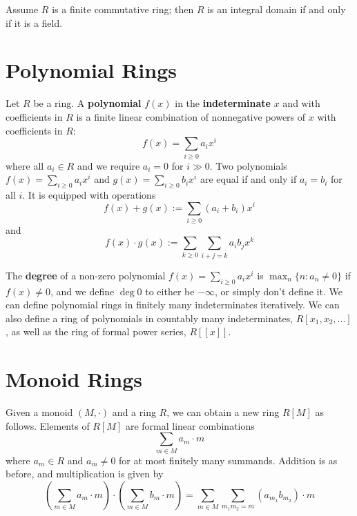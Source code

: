 \documentclass[12pt, a4paper, oneside, openright, titlepage]{book}
\begin{document}
\begin{prop}
    Assume $R$ is a finite commutative ring; then $R$ is an integral domain if and only if it is a field.
\end{prop}

\section{Polynomial Rings}

\begin{defn}
    Let $R$ be a ring. A \textbf{polynomial} $f(x)$ in the \textbf{indeterminate} $x$ and with coefficients in $R$ is a finite linear combination of nonnegative powers of $x$ with coefficients in $R$: \begin{equation*}
        f(x) = \sum_{i\geq 0 }a_ix^i
    \end{equation*}
    where all $a_i \in R$ and we require $a_i = 0$ for $i \gg 0$. Two polynomials $f(x) = \sum_{i\geq 0}a_ix^i$ and $g(x) = \sum_{i\geq 0}b_ix^i$ are equal if and only if $a_i = b_i$ for all $i$. It is equipped with operations \begin{equation*}
        f(x) + g(x) := \sum_{i\geq0}(a_i+b_i)x^i
    \end{equation*}
    and \begin{equation*}
        f(x)\cdot g(x) := \sum_{k\geq 0}\sum_{i+j=k}a_ib_jx^{k}
    \end{equation*}
\end{defn}

The \textbf{degree} of a non-zero polynomial $f(x) = \sum_{i\geq 0}a_ix^i$ is $\max_n\{n:a_n\neq 0\}$ if $f(x) \neq 0$, and we define $\deg 0$ to either be $-\infty$, or simply don't define it. We can define polynomial rings in finitely many indeterminates iteratively. We can also define a ring of polynomials in countably many indeterminates, $R[x_1,x_2,...]$, as well as the ring of formal power series, $R[[x]]$.

\section{Monoid Rings}

Given a monoid $(M,\cdot)$ and a ring $R$, we can obtain a new ring $R[M]$ as follows. Elements of $R[M]$ are formal linear combinations \begin{equation*}
    \sum_{m\in M}a_m\cdot m
\end{equation*}
where $a_m \in R$ and $a_m \neq 0$ for at most finitely many summands. Addition is as before, and multiplication is given by \begin{equation*}
    \left(\sum_{m\in M}a_m\cdot m\right)\cdot \left(\sum_{m \in M}b_m\cdot m\right) = \sum_{m \in M}\sum_{m_1m_2 = m}(a_{m_1}b_{m_2})\cdot m
\end{equation*}
\end{document}

